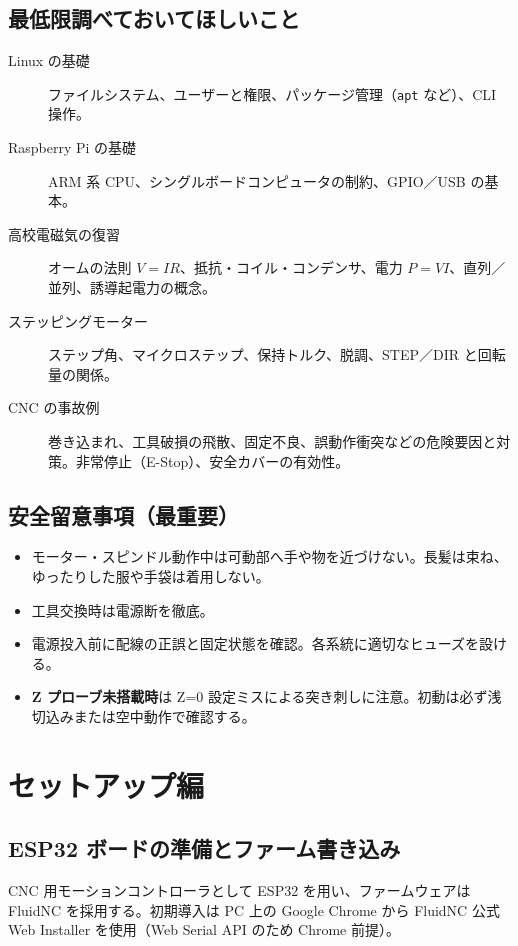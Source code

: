 \documentclass[uplatex,dvipdfmx]{ujarticle}
\begin{document}
\subsection{最低限調べておいてほしいこと}

\begin{description}
  \item[Linux の基礎] ファイルシステム、ユーザーと権限、パッケージ管理（\texttt{apt} など）、CLI 操作。
  \item[Raspberry Pi の基礎] ARM 系 CPU、シングルボードコンピュータの制約、GPIO／USB の基本。
  \item[高校電磁気の復習] オームの法則 $V=IR$、抵抗・コイル・コンデンサ、電力 $P=VI$、直列／並列、誘導起電力の概念。
  \item[ステッピングモーター] ステップ角、マイクロステップ、保持トルク、脱調、STEP／DIR と回転量の関係。
  \item[CNC の事故例] 巻き込まれ、工具破損の飛散、固定不良、誤動作衝突などの危険要因と対策。非常停止（E-Stop）、安全カバーの有効性。
\end{description}

\subsection{安全留意事項（最重要）}

\begin{itemize}
  \item モーター・スピンドル動作中は可動部へ手や物を近づけない。長髪は束ね、ゆったりした服や手袋は着用しない。
  \item 工具交換時は電源断を徹底。
  \item 電源投入前に配線の正誤と固定状態を確認。各系統に適切なヒューズを設ける。
  \item \textbf{Z プローブ未搭載時}は Z=0 設定ミスによる突き刺しに注意。初動は必ず浅切込みまたは空中動作で確認する。
\end{itemize}

\section{セットアップ編}

\subsection{ESP32 ボードの準備とファーム書き込み}

CNC 用モーションコントローラとして ESP32 を用い、ファームウェアは FluidNC を採用する\cite{fluidnc-installer,fluidnc-config}。初期導入は PC 上の Google Chrome から FluidNC 公式 Web Installer を使用（Web Serial API のため Chrome 前提\cite{chrome-webserial}）。
\end{document}
